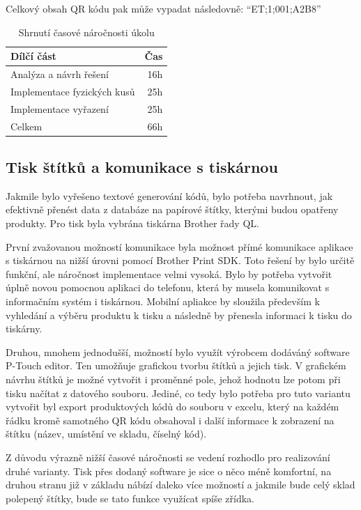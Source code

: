 Celkový obsah QR kódu pak může vypadat následovně: \enquote{ET;1;001;A2B8}


\begin{table}
	\centering
	\caption[Časová náročnost úkolu na zavedení množstevních jednotek]{Shrnutí časové náročnosti úkolu}
	\label{tab:TopLevelTableLabel}
	{
		\begin{tabular}{lr}
			\toprule
			Dílčí část & Čas\\
			\midrule
			Analýza a návrh řešení & 16h \\
			Implementace fyzických kusů & 25h \\
            Implementace vyřazení & 25h \\
            \midrule
            Celkem  & 66h \\
			\midrule
		\end{tabular}
	}
\end{table}

\subsection{Tisk štítků a komunikace s tiskárnou}

Jakmile bylo vyřešeno textové generování kódů, bylo potřeba navrhnout, jak efektivně přenést data z databáze na papírové štítky, kterými budou opatřeny produkty. Pro tisk byla vybrána tiskárna Brother řady QL. 

První zvažovanou možností komunikace byla možnost přímé komunikace aplikace s tiskárnou na nižší úrovni pomocí Brother Print SDK. \cite{brotherInformationLabel} Toto řešení by bylo určitě funkční, ale náročnost implementace velmi vysoká. Bylo by potřeba vytvořit úplně novou pomocnou aplikaci do telefonu, která by musela komunikovat s informačním systém i tiskárnou. Mobilní apliakce by sloužila především k vyhledání a výběru produktu k tisku a následně by přenesla informaci k tisku do tiskárny.

Druhou, mnohem jednodušší, možností bylo využít výrobcem dodáváný software P-Touch editor. Ten umožňuje grafickou tvorbu štítků a jejich tisk. V grafickém návrhu štítků je možné vytvořit i proměnné pole, jehož hodnotu lze potom při tisku načítat z datového souboru.
Jediné, co tedy bylo potřeba pro tuto variantu vytvořit byl export produktových kódů do souboru v excelu, který na každém řádku kromě samotného QR kódu obsahoval i další informace k zobrazení na štítku (název, umístění ve skladu, číselný kód).

Z důvodu výrazně nižší časové náročnosti se vedení rozhodlo pro realizování druhé varianty. Tisk přes dodaný software je sice o něco méně komfortní, na druhou stranu již v základu nábízí daleko více možností a jakmile bude celý sklad polepený štítky, bude se tato funkce využícat spíše zřídka. 

